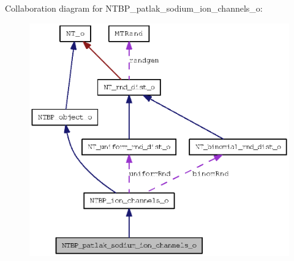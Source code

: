 Collaboration diagram for NTBP\_\-patlak\_\-sodium\_\-ion\_\-channels\_\-o:
\nopagebreak
\begin{figure}[H]
\begin{center}
\leavevmode
\includegraphics[width=385pt]{class_n_t_b_p__patlak__sodium__ion__channels__o__coll__graph}
\end{center}
\end{figure}
